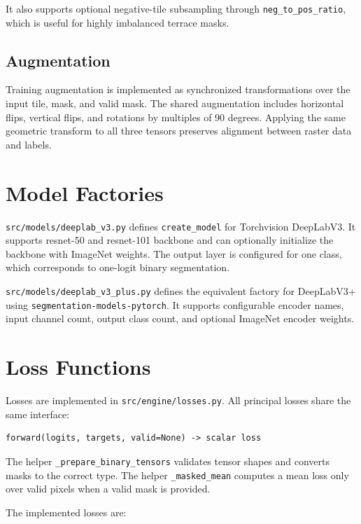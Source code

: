 \begin{sloppypar}
It also supports optional negative-tile subsampling through \texttt{neg\_to\_pos\_ratio}, which is useful for highly imbalanced terrace masks.

\subsection{Augmentation}

Training augmentation is implemented as synchronized transformations over the input tile, mask, and valid mask. The shared augmentation includes horizontal flips, vertical flips, and rotations by multiples of 90 degrees. Applying the same geometric transform to all three tensors preserves alignment between raster data and labels.

\section{Model Factories}

\texttt{src/models/deeplab\_v3.py} defines \texttt{create\_model} for Torchvision DeepLabV3. It supports \gls{resnet}-50 and \gls{resnet}-101 backbone and can optionally initialize the backbone with ImageNet weights. The output layer is configured for one class, which corresponds to one-logit binary segmentation.

\texttt{src/models/deeplab\_v3\_plus.py} defines the equivalent factory for DeepLabV3+ using \texttt{segmentation-models-pytorch}. It supports configurable encoder names, input channel count, output class count, and optional ImageNet encoder weights.

\section{Loss Functions}

Losses are implemented in \texttt{src/engine/losses.py}. All principal losses share the same interface:

\begin{verbatim}
forward(logits, targets, valid=None) -> scalar loss
\end{verbatim}

The helper \texttt{\_prepare\_binary\_tensors} validates tensor shapes and converts masks to the correct type. The helper \texttt{\_masked\_mean} computes a mean loss only over valid pixels when a valid mask is provided.

The implemented losses are:


\end{sloppypar}
